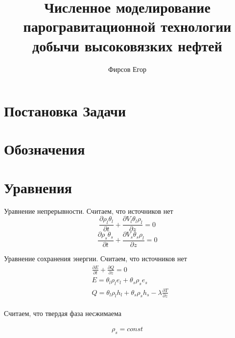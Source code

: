 \documentclass[12pt]{article}
\title{Численное моделирование парогравитационной технологии добычи высоковязких нефтей}
\author{Фирсов Егор}
\newcommand{\pd}[2]{\frac{\partial #1}{\partial #2}}
\begin{document}
\maketitle
\newpage
\section*{Постановка Задачи}



\newpage
\section*{Обозначения}

\section*{Уравнения}

Уравнение непрерывности. Считаем, что источников нет
\begin{equation}
\pd{\rho_l\theta_l}{t} + \pd{V_l\theta_l\rho_l}{z} =0
\label{eq:contin_l}
\end{equation}
\begin{equation}
\pd{\rho_s\theta_s}{t} + \pd{V_s\theta_s\rho_l}{z} =0
\label{eq:contin_s}
\end{equation}

Уравнение сохранения энергии. Считаем, что источников нет
\begin{equation}
\begin{aligned}
&\pd{E}{t} + \pd{Q}{z} =0 \\
&E=\theta_l\rho_l e_l + \theta_s\rho_s e_s \\
&Q=\theta_l\rho_l h_l + \theta_s\rho_s h_s - \lambda \pd{T}{z}\\
\label{eq:conserv}
\end{aligned}
\end{equation}

Считаем, что твердая фаза несжимаема

\begin{equation}
\begin{aligned}
\rho_s = const \\
\label{rho_const}
\end{aligned}
\end{equation}
\end{document}
